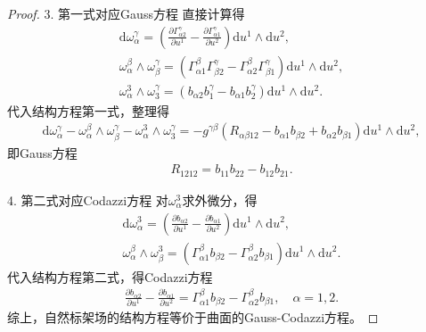 \documentclass[../../main.tex]{subfiles}%
\begin{document}
\begin{proof}
3. 第一式对应Gauss方程
直接计算得
\begin{gather*}
\mathrm{d}\omega^\gamma_\alpha=\left(\frac{\partial\Gamma^\gamma_{\alpha2}}{\partial u^1}-\frac{\partial\Gamma^\gamma_{\alpha1}}{\partial u^2}\right)\mathrm{d}u^1\wedge\mathrm{d}u^2,\\
\omega^\beta_\alpha\wedge\omega^\gamma_\beta=\left(\Gamma^\beta_{\alpha1}\Gamma^\gamma_{\beta2}-\Gamma^\beta_{\alpha2}\Gamma^\gamma_{\beta1}\right)\mathrm{d}u^1\wedge\mathrm{d}u^2,\\
\omega^3_\alpha\wedge\omega^\gamma_3=(b_{\alpha2}b_1^\gamma-b_{\alpha1}b_2^\gamma)\mathrm{d}u^1\wedge\mathrm{d}u^2.
\end{gather*}
代入结构方程第一式，整理得
\begin{align*}
\mathrm{d}\omega^\gamma_\alpha-\omega^\beta_\alpha\wedge\omega^\gamma_\beta-\omega^3_\alpha\wedge\omega^\gamma_3=-g^{\gamma\beta}\left(R_{\alpha\beta12}-b_{\alpha1}b_{\beta2}+b_{\alpha2}b_{\beta1}\right)\mathrm{d}u^1\wedge\mathrm{d}u^2,
\end{align*}
即Gauss方程
\begin{align}
R_{1212}=b_{11}b_{22}-b_{12}b_{21}.
\label{eq:gauss-equation}
\end{align}

4. 第二式对应Codazzi方程
对$\omega^3_\alpha$求外微分，得
\begin{align*}
\mathrm{d}\omega^3_\alpha=\left(\frac{\partial b_{\alpha2}}{\partial u^1}-\frac{\partial b_{\alpha1}}{\partial u^2}\right)\mathrm{d}u^1\wedge\mathrm{d}u^2,\\
\omega^\beta_\alpha\wedge\omega^3_\beta=\left(\Gamma^\beta_{\alpha1}b_{\beta2}-\Gamma^\beta_{\alpha2}b_{\beta1}\right)\mathrm{d}u^1\wedge\mathrm{d}u^2.
\end{align*}
代入结构方程第二式，得Codazzi方程
\begin{align}
\frac{\partial b_{\alpha2}}{\partial u^1}-\frac{\partial b_{\alpha1}}{\partial u^2}=\Gamma^\beta_{\alpha1}b_{\beta2}-\Gamma^\beta_{\alpha2}b_{\beta1},\quad \alpha=1,2.
\label{eq:codazzi-equation}
\end{align}
综上，自然标架场的结构方程等价于曲面的Gauss-Codazzi方程。
\end{proof}
\end{document}
